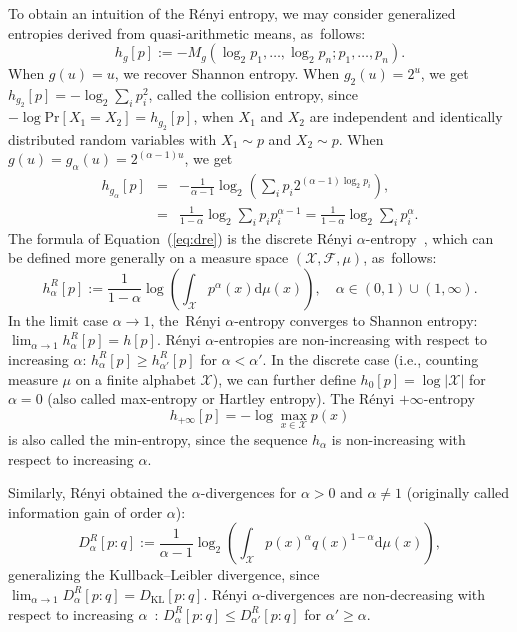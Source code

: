 \documentclass[entropy,article,accept,oneauthor,pdftex,entropy]{Definitions/mdpi}
\def\KL{\mathrm{KL}}
\def\dmu{\mathrm{d}\mu}
\def\calF{\mathcal{F}}
\def\calX{\mathcal{X}}
\def\dmu{\mathrm{d}\mu}
\begin{document}
To obtain an intuition of the R\'enyi entropy, we may consider generalized entropies derived from quasi-arithmetic means, as~follows:
\begin{equation}
h_g[p]:=-M_g(\log_2 p_1,\ldots, \log_2 p_n;p_1,\ldots,p_n).
\end{equation} 
When $g(u)=u$, we recover Shannon entropy. When $g_2(u)=2^u$, we get $h_{g_2}[p]=-\log_2 \sum_i p_i^2$, called the collision entropy, since $-\log\mathrm{Pr}[X_1=X_2]=h_{g_2}[p]$, when $X_1$ and $X_2$ are independent and identically distributed random variables with
 $X_1\sim p$ and $X_2\sim p$.
When $g(u)=g_\alpha(u)=2^{(\alpha-1)u}$, we get
\begin{eqnarray}
h_{g_\alpha}[p] &=& -\frac{1}{\alpha-1}\log_2 \left(\sum_i p_i 2^{(\alpha-1)\log_2 p_i} \right),\\
&=&  \frac{1}{1-\alpha}\log_2 \sum_i p_i p_i^{\alpha-1}=\frac{1}{1-\alpha}\log_2 \sum_i p_i^{\alpha}.\label{eq:dre}
\end{eqnarray}
The formula of Equation~(\ref{eq:dre}) is the discrete R\'enyi $\alpha$-entropy~\cite{Renyi-1961}, which can be defined 
 more generally on a measure space $(\calX,\calF,\mu)$, as~follows:
\begin{equation}
h_\alpha^R[p] := \frac{1}{1-\alpha}\log\left( \int_\calX p^\alpha(x)\dmu(x)\right), \quad \alpha\in (0,1)\cup(1,\infty).
\end{equation}
In the limit case $\alpha\rightarrow 1$, the~R\'enyi $\alpha$-entropy converges to Shannon entropy:
$\lim_{\alpha\rightarrow 1} h_\alpha^R[p]=h[p]$.
R\'enyi $\alpha$-entropies are non-increasing with respect to increasing $\alpha$: 
$h_\alpha^R[p]\geq h_{\alpha'}^R[p]$ for $\alpha<\alpha'$.
In the discrete case (i.e., counting measure $\mu$ on a finite alphabet $\calX$), we can further define $h_0[p]=\log |\calX|$ for $\alpha=0$ (also called max-entropy or Hartley entropy).
The R\'enyi $+\infty$-entropy 
$$
h_{+\infty}[p]=-\log\max_{x\in\calX} p(x)
$$ 
is also called the min-entropy, since the sequence $h_\alpha$ is non-increasing with respect to increasing $\alpha$.

Similarly, R\'enyi obtained the $\alpha$-divergences for $\alpha>0$ and $\alpha\not=1$ (originally called information gain of order $\alpha$):
\begin{equation}
D_\alpha^R[p:q] := \frac{1}{\alpha-1}\log_2\left( \int_\calX p(x)^\alpha q(x)^{1-\alpha}\dmu(x)\right),
\end{equation}
generalizing the Kullback--Leibler divergence,
since $\lim_{\alpha\rightarrow 1} D_\alpha^R[p:q]=D_\KL[p:q]$.
R\'enyi $\alpha$-divergences are non-decreasing with respect to increasing $\alpha$~\cite{RenyiDiv-2014}:
$D_\alpha^R[p:q]\leq D_{\alpha'}^R[p:q]$ for $\alpha'\geq\alpha$.
\end{document}
